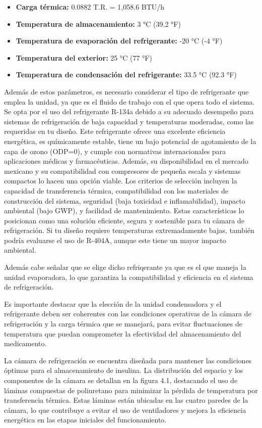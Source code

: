  \begin{itemize}
 	\item \textbf{Carga térmica:} 0.0882 T.R. = 1,058.6 BTU/h
 	\item \textbf{Temperatura de almacenamiento:} 3 °C (39.2 °F)
 	\item \textbf{Temperatura de evaporación del refrigerante:} -20 °C (-4 °F)
 	\item \textbf{Temperatura del exterior:} 25 °C (77 °F)
 	\item \textbf{Temperatura de condensación del refrigerante:} 33.5 °C (92.3 °F)
 \end{itemize}
 
 Además de estos parámetros, es necesario considerar el tipo de refrigerante que emplea la unidad, ya que es el fluido de trabajo con el que opera todo el sistema. Se opta por el uso del refrigerante R-134a debido a su adecuado desempeño para sistemas de refrigeración de baja capacidad y temperaturas moderadas, como las requeridas en tu diseño. Este refrigerante ofrece una excelente eficiencia energética, es químicamente estable, tiene un bajo potencial de agotamiento de la capa de ozono (ODP=0), y cumple con normativas internacionales para aplicaciones médicas y farmacéuticas. Además, su disponibilidad en el mercado mexicano y su compatibilidad con compresores de pequeña escala y sistemas compactos lo hacen una opción viable. Los criterios de selección incluyen la capacidad de transferencia térmica, compatibilidad con los materiales de construcción del sistema, seguridad (baja toxicidad e inflamabilidad), impacto ambiental (bajo GWP), y facilidad de mantenimiento. Estas características lo posicionan como una solución eficiente, segura y sostenible para tu cámara de refrigeración. Si tu diseño requiere temperaturas extremadamente bajas, también podría evaluarse el uso de R-404A, aunque este tiene un mayor impacto ambiental.

Además cabe señalar que se elige dicho refriqerante ya que es el que maneja la unidad evaporadora, lo que garantiza la compatibilidad y eficiencia en el sistema de refrigeración.
 
 Es importante destacar que la elección de la unidad condensadora y el refrigerante deben ser coherentes con las condiciones operativas de la cámara de refrigeración y la carga térmica que se manejará, para evitar fluctuaciones de temperatura que puedan comprometer la efectividad del almacenamiento del medicamento.
 

 La cámara de refrigeración se encuentra diseñada para mantener las condiciones óptimas para el almacenamiento de insulina. La distribución del espacio y los componentes de la cámara se detallan en la figura 4.1, destacando el uso de láminas compuestas de poliuretano para minimizar la pérdida de temperatura por transferencia térmica. Estas láminas están ubicadas en las cuatro paredes de la cámara, lo que contribuye a evitar el uso de ventiladores y mejora la eficiencia energética en las etapas iniciales del funcionamiento.
 
